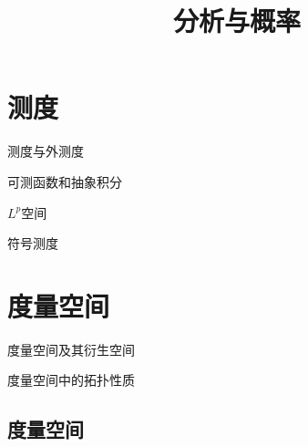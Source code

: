\documentclass[lang=cn,10pt]{elegantbook}
\title{分析与概率}
\begin{document}
	
	
	\maketitle
	\frontmatter
	
	\tableofcontents
	
	\mainmatter
	\chapter{测度}
	\begin{introduction}
		\item 测度与外测度
		\item 可测函数和抽象积分
		\item \(L^p\)空间
		\item 符号测度
	\end{introduction}
	
	\chapter{度量空间}
	\begin{introduction}
		\item 度量空间及其衍生空间
		\item 度量空间中的拓扑性质
	\end{introduction}
	
	\section{度量空间}
	
\end{document}
